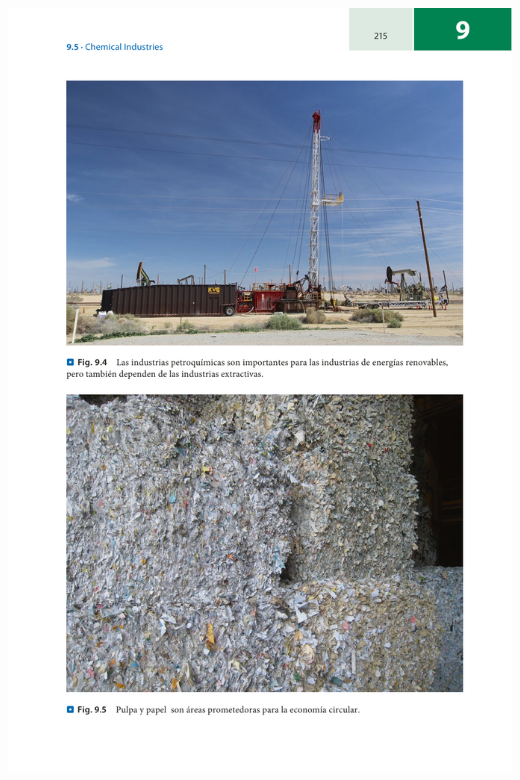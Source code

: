 \documentclass[runningheads]{llncs}
\begin{document}
\includegraphics[scale=0.95]{9(4).pdf}
\end{document}
